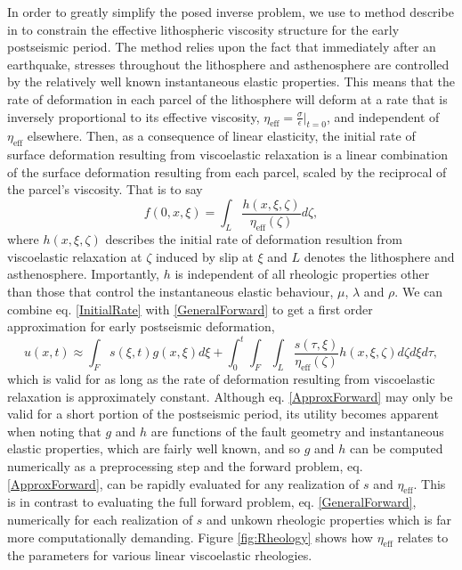 \documentclass[12pt]{article}
\begin{document}
In order to greatly simplify the posed inverse problem, we use to method describe in \cite{Hines2015} to constrain the effective lithospheric viscosity structure for the early postseismic period.  The method relies upon the fact that immediately after an earthquake, stresses throughout the lithosphere and asthenosphere are controlled by the relatively well known instantaneous elastic properties.  This means that the rate of deformation in each parcel of the lithosphere will deform at a rate that is inversely proportional to its effective viscosity, $\eta_{\mathrm{eff}}=\frac{\sigma}{\dot{\epsilon}}|_{t=0}$, and independent of $\eta_{\mathrm{eff}}$ elsewhere. Then, as a consequence of linear elasticity, the initial rate of surface deformation resulting from viscoelastic relaxation is a linear combination of the surface deformation resulting from each parcel, scaled by the reciprocal of the parcel's viscosity. That is to say   
\begin{equation}\label{InitialRate}
  f(0,x,\xi) = \int_L \frac{h(x,\xi,\zeta)}{\eta_\mathrm{eff}(\zeta)} d\zeta, 
\end{equation}
where $h(x,\xi,\zeta)$ describes the initial rate of deformation resultion from viscoelastic relaxation at $\zeta$ induced by slip at $\xi$ and $L$ denotes the lithosphere and asthenosphere. Importantly, $h$ is independent of all rheologic properties other than those that control the instantaneous elastic behaviour, $\mu$, $\lambda$ and $\rho$. We can combine eq. \ref{InitialRate} with \ref{GeneralForward} to get a first order approximation for early postseismic deformation,
\begin{equation}\label{ApproxForward}
  u(x,t) \approx \int_F s(\xi,t)g(x,\xi)d\xi + 
           \int_0^t\int_F\int_L \frac{s(\tau,\xi)}{\eta_\mathrm{eff}(\zeta)} h(x,\xi,\zeta) d\zeta d\xi d\tau,
\end{equation}
which is valid for as long as the rate of deformation resulting from viscoelastic relaxation is approximately constant. Although eq. \ref{ApproxForward} may only be valid for a short portion of the postseismic period, its utility becomes apparent when noting that $g$ and $h$ are functions of the fault geometry and instantaneous elastic properties, which are fairly well known, and so $g$ and $h$ can be computed numerically as a preprocessing step and the forward problem, eq. \ref{ApproxForward}, can be rapidly evaluated for any realization of $s$ and $\eta_{\mathrm{eff}}$.  This is in contrast to evaluating the full forward problem, eq. \ref{GeneralForward}, numerically for each realization of $s$ and unkown rheologic properties which is far more computationally demanding. Figure \ref{fig:Rheology} shows how $\eta_\mathrm{eff}$ relates to the parameters for various linear viscoelastic rheologies.    
\end{document}
